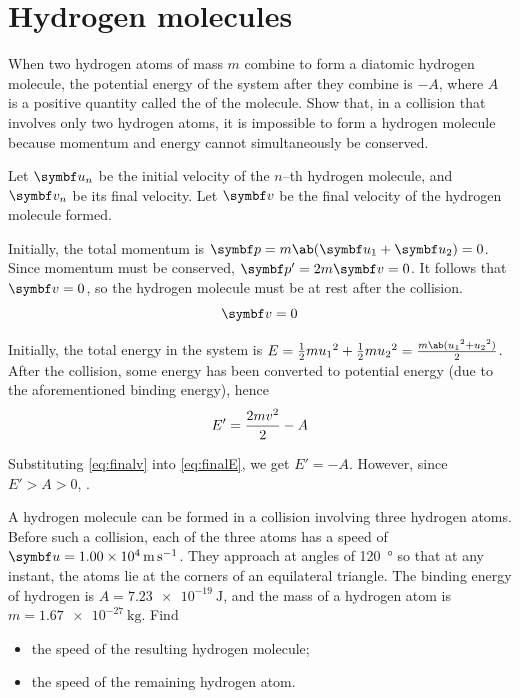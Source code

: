\section{Hydrogen molecules}
\begin{problem}
  When two hydrogen atoms of mass \(m\) combine to form a diatomic
  hydrogen molecule,
  the potential energy of the system after they combine is \(-A\),
  where \(A\) is a positive quantity called the
   of the molecule.
  Show that, in a collision that involves only two hydrogen atoms, it
  is impossible to form a hydrogen molecule because momentum and energy
  cannot simultaneously be conserved.
\end{problem}

Let \(\mv{u}_n\) be the initial velocity of the \(n\)--th hydrogen
molecule, and
\(\mv{v}_n\) be its final velocity. Let \(\mv{v}\) be the final
velocity of the
hydrogen molecule formed.

Initially, the total momentum is \(\mv{p} = m\ab(\mv{u}_1 + \mv{u}_2)
= 0\). Since momentum
must be conserved, \(\mv{p}' = 2m\mv{v} = 0\). It follows that
\(\mv{v} = 0\), so
the hydrogen molecule must be at rest after the collision.
\begin{equation}
  \mv{v} = 0
  \label{eq:finalv}
\end{equation}

Initially, the total energy in the system is \(E = \f{1}{2}m{u_1}^2 +
\f{1}{2}m{u_2}^2 = \f{m\ab({u_1}^2 + {u_2}^2)}{2}\).
After the collision, some energy has been converted to potential
energy (due to the aforementioned binding energy),
hence
\begin{equation}
  E' = \frac{2mv^2}{2} - A
  \label{eq:finalE}
\end{equation}

Substituting \cref{eq:finalv} into \cref{eq:finalE}, we get \(E' = -A\).
However, since \(E' > A > 0\), .

\begin{problem}
  A hydrogen molecule can be formed in a collision involving three
  hydrogen atoms.
  Before such a collision, each of the three atoms has a speed of
  \(\mv{u}=\qty{1.00e4}{\metre\per\second}\). They approach at angles
  of \qty{120}{\degree}
  so that at any instant, the atoms lie at the corners of an
  equilateral triangle.
  The binding energy of hydrogen is \(A = \qty{7.23e-19}{\joule}\), and the mass
  of a hydrogen atom is \(m = \qty{1.67e-27}{\kg}\). Find
  \begin{itemize}
    \item the speed of the resulting hydrogen molecule;
    \item the speed of the remaining hydrogen atom.
  \end{itemize}
\end{problem}

